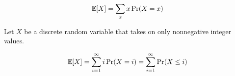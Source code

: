 
\begin{frame}{}
  \centerline{}

  \begin{definition}[Expectation]
    \[
      \operatorname*{\mathbb{E}}[X] = \sum_{x} x \Pr(X = x)
    \]
  \end{definition}

  \pause
  \vspace{0.50cm}
  \begin{theorem}[]
    Let $X$ be a discrete random variable that takes on only nonnegative integer values.

    \[
      \operatorname*{\mathbb{E}}[X] = \sum_{i=1}^{\infty} i \Pr(X = i) = \sum_{i=1}^{\infty} \Pr(X \le i)
    \]
  \end{theorem}
\end{frame}
